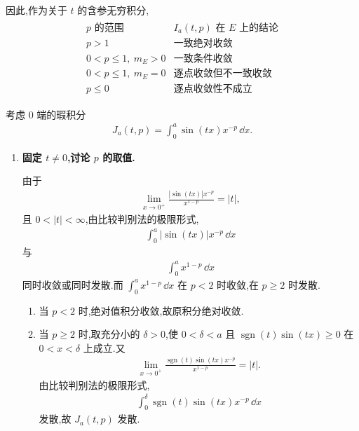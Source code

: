 \begin{exbox}
\begin{enumerate}
		因此,作为关于 $t$ 的含参无穷积分,
		\begin{gather*}
		\begin{array}{c|c}
			p\text{ 的范围}&I_a(t,p)\text{ 在 }E\text{ 上的结论}\\ \hline
			p>1&\text{一致绝对收敛}\\[3pt]
			0<p\leq1,\ m_E>0&\text{一致条件收敛}\\[3pt]
			0<p\leq1,\ m_E=0&\text{逐点收敛但不一致收敛}\\[3pt]
			p\leq0&\text{逐点收敛性不成立}
		\end{array}
		\end{gather*}
	\end{enumerate}
\end{exbox}

\begin{exbox}
	考虑 $0$ 端的瑕积分
	\begin{align*}
		J_a(t,p)=\int_0^a \sin(tx)x^{-p}\,\dd x.
	\end{align*}

	\begin{enumerate}
		\item \textbf{固定 $t\neq0$,讨论 $p$ 的取值.}

		由于
		\begin{align*}
			\lim_{x\to0^+}\frac{|\sin(tx)|x^{-p}}{x^{1-p}}=|t|,
		\end{align*}
		且 $0<|t|<\infty$,由比较判别法的极限形式,
		\begin{align*}
			\int_0^a |\sin(tx)|x^{-p}\,\dd x
		\end{align*}
		与
		\begin{align*}
			\int_0^a x^{1-p}\,\dd x
		\end{align*}
		同时收敛或同时发散.而 $\int_0^a x^{1-p}\,\dd x$ 在 $p<2$ 时收敛,在 $p\geq2$ 时发散.

		\begin{enumerate}
			\item 当 $p<2$ 时,绝对值积分收敛,故原积分绝对收敛.

			\item 当 $p\geq2$ 时,取充分小的 $\delta>0$,使 $0<\delta<a$ 且 $\operatorname{sgn}(t)\sin(tx)\geq0$ 在 $0<x<\delta$ 上成立.又
			\begin{align*}
				\lim_{x\to0^+}
				\frac{\operatorname{sgn}(t)\sin(tx)x^{-p}}{x^{1-p}}
				=|t|.
			\end{align*}
			由比较判别法的极限形式,
			\begin{align*}
				\int_0^\delta \operatorname{sgn}(t)\sin(tx)x^{-p}\,\dd x
			\end{align*}
			发散,故 $J_a(t,p)$ 发散.
		\end{enumerate}


\end{enumerate}
\end{exbox}
